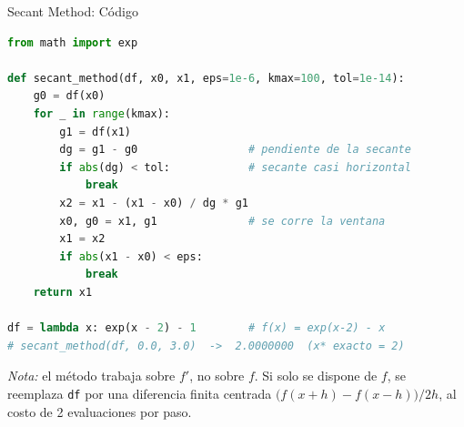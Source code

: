 \begin{frame}[fragile]{Secant Method: Código}
\begin{lstlisting}[language=Python]
from math import exp

def secant_method(df, x0, x1, eps=1e-6, kmax=100, tol=1e-14):
    g0 = df(x0)
    for _ in range(kmax):
        g1 = df(x1)
        dg = g1 - g0                 # pendiente de la secante
        if abs(dg) < tol:            # secante casi horizontal
            break
        x2 = x1 - (x1 - x0) / dg * g1
        x0, g0 = x1, g1              # se corre la ventana
        x1 = x2
        if abs(x1 - x0) < eps:
            break
    return x1

df = lambda x: exp(x - 2) - 1        # f(x) = exp(x-2) - x
# secant_method(df, 0.0, 3.0)  ->  2.0000000  (x* exacto = 2)
\end{lstlisting}

    \vspace{0.2em}
    \tiny
    \textit{Nota:} el método trabaja sobre $f'$, no sobre $f$. Si solo se dispone de $f$,
    se reemplaza \texttt{df} por una diferencia finita centrada
    $\big(f(x+h)-f(x-h)\big)/2h$, al costo de 2 evaluaciones por paso.
\end{frame}
